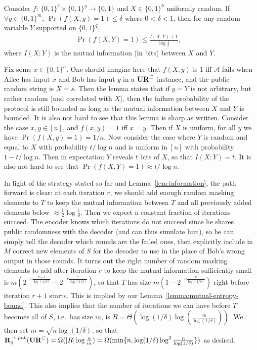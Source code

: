 \begin{lemma}\label{lem:information}
  Consider $f$: $\{0,1\}^b\times \{0,1\}^q\rightarrow \{0,1\}$ and $X\in\{0,1\}^b$ uniformly random. If $\forall y\in \{0,1\}^m,\ \Pr(f(X,y)=1)\le \delta$ where $0<\delta<1$, then for any random variable $Y$ supported on $\{0,1\}^q$,
  \begin{align}
    \Pr(f(X,Y)=1)\le \frac{I(X;Y)+1}{\log \frac{1}{\delta}},
  \end{align}
  where $I(X;Y)$ is the mutual information (in bits) between $X$ and $Y$.
\end{lemma}
Fix some $x\in\{0,1\}^n$. One should imagine here that $f(X,y)$ is $1$ iff $\mathcal{A}$ fails when Alice has input $x$ and Bob has input $y$ in a $\mathbf{UR}^\subset$ instance, and the public random string is $X=s$. Then the lemma states that if $y=Y$ is not arbitrary, but rather random (and correlated with $X$), then the failure probability of the protocol is still bounded as long as the mutual information between $X$ and $Y$ is bounded. It is also not hard to see that this lemma is sharp as written. Consider the case $x,y\in[n]$, and $f(x,y) = 1$ iff $x = y$. Then if $X$ is uniform, for all $y$ we have $\Pr(f(X,y) = 1) = 1/n$. Now consider the case where $Y$ is random and equal to $X$ with probability $t/\log n$ and is uniform in $[n]$ with probability $1 - t/\log n$. Then in expectation $Y$ reveals $t$ bits of $X$, so that $I(X;Y) = t$. It is also not hard to see that $\Pr(f(X,Y) = 1) \approx t/\log n$.

In light of the strategy stated so far and Lemma~\ref{lem:information}, the path forward is clear: at each iteration $r$, we should add enough random masking elements to $T$ to keep the mutual information between $T$ and all previously added elements below $\approx \frac 12 \log \frac 1{\delta}$. Then we expect a constant fraction of iterations succeed. The encoder knows which iterations do not succeed since he shares public randomness with the decoder (and can thus simulate him), so he can simply tell the decoder which rounds are the failed ones, then explicitly include in $M$ correct new elements of $S$ for the decoder to use in the place of Bob's wrong output in those rounds. It turns out the right number of random masking elements to add after iteration $r$ to keep the mutual information sufficiently small is $m(2^{-c\frac{r-1}{\log(1/\delta)}} - 2^{-c\frac{r}{\log(1/\delta)}})$, so that $T$ has size $m(1 - 2^{-c\frac r{\log(1/\delta)}})$ right before iteration $r+1$ starts. This is implied by our Lemma~\ref{lemma:mutual-entropy-bound}. This also implies that the number of iterations we can have before $T$ becomes all of $S$, i.e.\ has size $m$, is $R = \Theta(\log(1/\delta)\log(\frac{m}{\log(1/\delta)}))$. We then set $m = \sqrt{n\log(1/\delta)}$, so that $\mathbf{R}^{\rightarrow,pub}_\delta(\mathbf{UR}^\subset) = \Omega(|R|\log \frac nm) = \Omega(\min\{n, \log(1/\delta)\log^2 \frac n{\log(1/\delta)}\})$ as desired.

